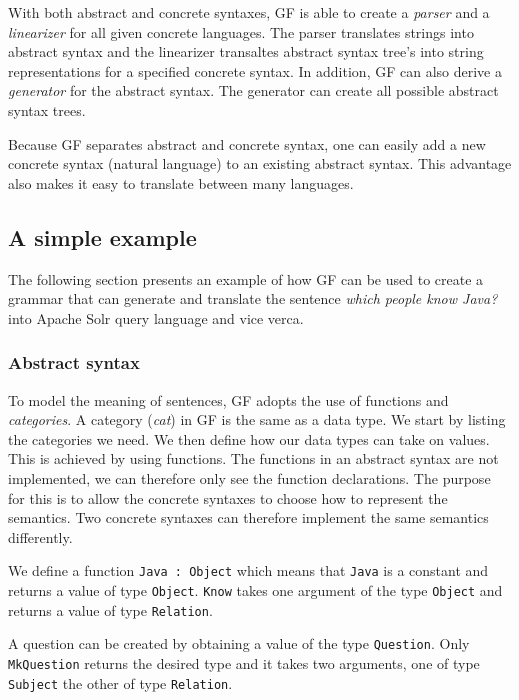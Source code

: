 With both abstract and concrete syntaxes, GF is able to create a \emph{parser} and a \emph{linearizer} for all given concrete languages. The parser translates strings into abstract syntax and the linearizer transaltes abstract syntax tree's into string representations for a specified concrete syntax. In addition, GF can also derive a \emph{generator} for the abstract syntax. The generator can create all possible abstract syntax trees.

Because GF separates abstract and concrete syntax, one can easily add a new concrete syntax (natural language) to an existing abstract syntax. This advantage also makes it easy to translate between many languages.

\subsection{A simple example}
The following section presents an example of how GF can be used to create a grammar that can generate and translate the sentence \emph{which people know Java?} into Apache Solr query language and vice verca.

\subsubsection*{Abstract syntax}
To model the meaning of sentences, GF adopts the use of functions and \emph{categories}. A category (\emph{cat}) in GF is the same as a data type. We start by listing the categories we need. We then define how our data types can take on values. This is achieved by using functions. The functions in an abstract syntax are not implemented, we can therefore only see the function declarations. The purpose for this is to allow the concrete syntaxes to choose how to represent the semantics. Two concrete syntaxes can therefore implement the same semantics differently.

We define a function \texttt{Java : Object} which means that \texttt{Java} is a constant  and returns a value of type \texttt{Object}. \texttt{Know} takes one argument of the type \texttt{Object} and returns a value of type \texttt{Relation}.

A question can be created by obtaining a value of the type \texttt{Question}. Only \texttt{MkQuestion} returns the desired type and it takes two arguments, one of type \texttt{Subject} the other of type \texttt{Relation}.

